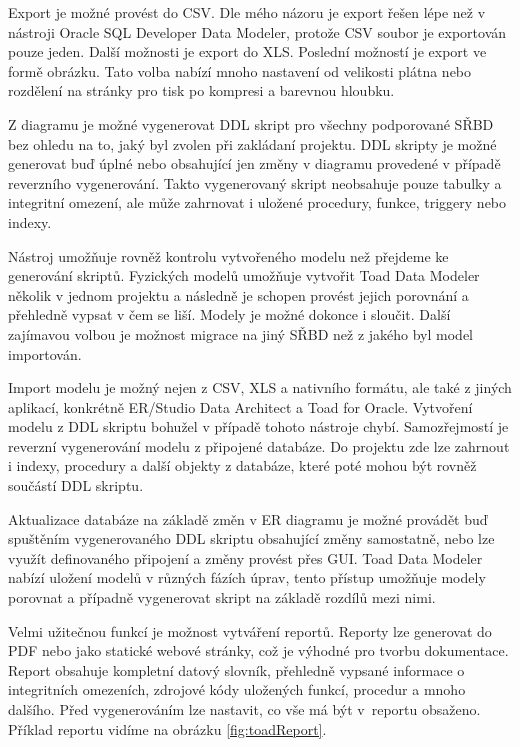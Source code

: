 \documentclass[czech,bachelor,public,dept460,male,oneside]{diploma}
\begin{document}
		Export je možné provést do CSV. Dle mého názoru je export řešen lépe než v nástroji Oracle SQL Developer Data Modeler, protože CSV soubor je exportován pouze jeden. Další možnosti je export do XLS. Poslední možností je export ve formě obrázku. Tato volba nabízí mnoho nastavení od velikosti plátna nebo rozdělení na stránky pro tisk po kompresi a barevnou hloubku.
		
		Z diagramu je možné vygenerovat DDL skript pro všechny podporované SŘBD bez ohledu na to, jaký byl zvolen při zakládaní projektu. DDL skripty je možné generovat buď úplné nebo obsahující jen změny v diagramu provedené v případě reverzního vygenerování. Takto vygenerovaný skript neobsahuje pouze tabulky a integritní omezení, ale může zahrnovat i uložené procedury, funkce, triggery nebo indexy. 
		
		Nástroj umožňuje rovněž kontrolu vytvořeného modelu než přejdeme ke generování skriptů. Fyzických modelů umožňuje vytvořit Toad Data Modeler několik v jednom projektu a následně je schopen provést jejich porovnání a přehledně vypsat v čem se liší. Modely je možné dokonce i sloučit. Další zajímavou volbou je možnost migrace na jiný SŘBD než z jakého byl model importován.
		
		Import modelu je možný nejen z CSV, XLS a nativního formátu, ale také z jiných aplikací, konkrétně ER/Studio Data Architect a Toad for Oracle. Vytvoření modelu z DDL skriptu bohužel v případě tohoto nástroje chybí. Samozřejmostí je reverzní vygenerování modelu z připojené databáze. Do projektu zde lze zahrnout i indexy, procedury a další objekty z databáze, které poté mohou být rovněž součástí DDL skriptu.
		
		Aktualizace databáze na základě změn v ER diagramu je možné provádět buď spuštěním vygenerovaného DDL skriptu obsahující změny samostatně, nebo lze využít definovaného připojení a změny provést přes GUI. Toad Data Modeler nabízí uložení modelů v různých fázích úprav, tento přístup umožňuje modely porovnat a případně vygenerovat skript na základě rozdílů mezi nimi.
		
		Velmi užitečnou funkcí je možnost vytváření reportů. Reporty lze generovat do PDF nebo jako statické webové stránky, což je výhodné pro tvorbu dokumentace. Report obsahuje kompletní datový slovník, přehledně vypsané informace o integritních omezeních, zdrojové kódy uložených funkcí, procedur a mnoho dalšího. Před vygenerováním lze nastavit, co vše má být v~reportu obsaženo. Příklad reportu vidíme na obrázku \ref{fig:toadReport}.
		
\end{document}
